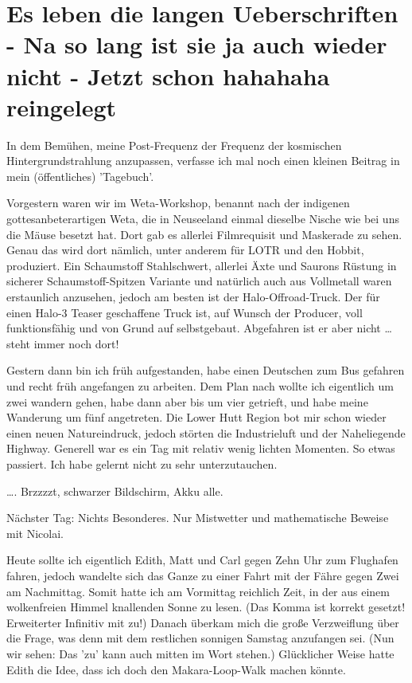 \chapter{Es leben die langen Ueberschriften - Na so lang ist sie ja auch wieder nicht - Jetzt schon hahahaha reingelegt}

In dem Bemühen, meine Post-Frequenz der Frequenz der kosmischen
Hintergrundstrahlung anzupassen, verfasse ich mal noch einen kleinen
Beitrag in mein (öffentliches) 'Tagebuch'.

Vorgestern waren wir im Weta-Workshop, benannt nach der indigenen
gottesanbeterartigen Weta, die in Neuseeland einmal dieselbe Nische wie
bei uns die Mäuse besetzt hat. Dort gab es allerlei Filmrequisit und
Maskerade zu sehen. Genau das wird dort nämlich, unter anderem für LOTR
und den Hobbit, produziert. Ein Schaumstoff Stahlschwert, allerlei Äxte
und Saurons Rüstung in sicherer Schaumstoff-Spitzen Variante und
natürlich auch aus Vollmetall waren erstaunlich anzusehen, jedoch am
besten ist der Halo-Offroad-Truck. Der für einen Halo-3 Teaser
geschaffene Truck ist, auf Wunsch der Producer, voll funktionsfähig und
von Grund auf selbstgebaut. Abgefahren ist er aber nicht \ldots{} steht
immer noch dort!

Gestern dann bin ich früh aufgestanden, habe einen Deutschen zum Bus
gefahren und recht früh angefangen zu arbeiten. Dem Plan nach wollte ich
eigentlich um zwei wandern gehen, habe dann aber bis um vier getrieft,
und habe meine Wanderung um fünf angetreten. Die Lower Hutt Region bot
mir schon wieder einen neuen Natureindruck, jedoch störten die
Industrieluft und der Naheliegende Highway. Generell war es ein Tag mit
relativ wenig lichten Momenten. So etwas passiert. Ich habe gelernt
nicht zu sehr unterzutauchen.

\ldots. Brzzzzt, schwarzer Bildschirm, Akku alle.

Nächster Tag: Nichts Besonderes. Nur Mistwetter und mathematische
Beweise mit Nicolai.

Heute sollte ich eigentlich Edith, Matt und Carl gegen Zehn Uhr zum
Flughafen fahren, jedoch wandelte sich das Ganze zu einer Fahrt mit der
Fähre gegen Zwei am Nachmittag. Somit hatte ich am Vormittag reichlich
Zeit, in der aus einem wolkenfreien Himmel knallenden Sonne zu lesen.
(Das Komma ist korrekt gesetzt! Erweiterter Infinitiv mit zu!) Danach
überkam mich die große Verzweiflung über die Frage, was denn mit dem
restlichen sonnigen Samstag anzufangen sei. (Nun wir sehen: Das 'zu'
kann auch mitten im Wort stehen.) Glücklicher Weise hatte Edith die
Idee, dass ich doch den Makara-Loop-Walk machen könnte.

